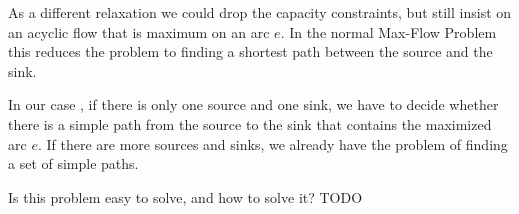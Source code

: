 As a different relaxation we could drop the capacity constraints, but still insist on an acyclic flow that is maximum 
on an arc $e$. In the normal Max-Flow Problem this reduces the problem to finding a shortest path between the source 
and the sink. 

In our case , if there is only one source and one sink, we have to decide whether there is a simple path from the 
source to the sink that contains the maximized arc $e$. If there are more sources and sinks, we already have the 
problem of finding a set of simple paths. %

%
Is this problem easy to solve, and how to solve it? TODO
%

